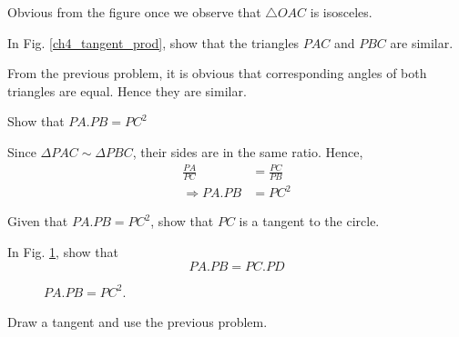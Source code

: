 %
\proof Obvious from the figure once we observe that $\triangle OAC$ is isosceles.
%
%
\begin{problem}
	In Fig. \ref{ch4_tangent_prod}, show that the triangles $PAC$ and $PBC$ are similar.
\end{problem}
\proof From the previous problem, it is obvious that corresponding angles of both triangles are equal.  Hence they are similar.
%
\begin{problem}
	Show that $PA.PB = PC^2$
\end{problem}
\proof Since $\Delta PAC \sim \Delta PBC$, their sides are in the same ratio.  Hence,
%
\begin{align}
\frac{PA}{PC} &= \frac{PC}{PB} \\
\Rightarrow PA.PB &=PC^2
\end{align}
%
\begin{problem}
Given that $PA.PB = PC^2$, show that $PC$ is a tangent to the circle.
\end{problem}
%
\begin{problem}
	In Fig. \ref{ch4_chord_tangent_prod}, show that\begin{equation}
	PA.PB = PC.PD
	\end{equation}
\end{problem}
%
\begin{figure}[!ht]
	\begin{center}
		
		\resizebox{\columnwidth}{!}{}
	\end{center}
	\caption{$PA.PB = PC^2$.}
	\label{ch4_chord_tangent_prod}	
\end{figure}

\proof Draw a tangent and use the previous problem.
